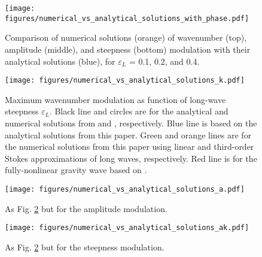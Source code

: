 \documentclass[lineno]{jfm}
\begin{document}
\begin{figure}
\centering
\texttt{[image: figures/numerical\_vs\_analytical\_solutions\_with\_phase.pdf]}
\caption{
  Comparison of numerical solutions (orange) of wavenumber (top), amplitude
  (middle), and steepness (bottom) modulation with their analytical solutions
  (blue), for $\varepsilon_L$ = 0.1, 0.2, and 0.4.
}
\label{fig:numerical_solutions}
\end{figure}

\begin{figure}
\centering
\texttt{[image: figures/numerical\_vs\_analytical\_solutions\_k.pdf]}
\caption{
  Maximum wavenumber modulation as function of long-wave steepness $\varepsilon_L$.
  Black line and circles are for the analytical and numerical solutions from
  \citet{longuet1960changes} and \citet{longuet1987propagation}, respectively.
  Blue line is based on the analytical solutions from this paper.
  Green and orange lines are for the numerical solutions from this paper
  using linear and third-order Stokes approximations of long waves, respectively.
  Red line is for the fully-nonlinear gravity wave based on \citet{clamond2018accurate}.
}
\label{fig:numerical_vs_analytical_k}
\end{figure}

\begin{figure}
\centering
\texttt{[image: figures/numerical\_vs\_analytical\_solutions\_a.pdf]}
\caption{
  As Fig. \ref{fig:numerical_vs_analytical_k} but for the amplitude modulation.
}
\label{fig:numerical_vs_analytical_a}
\end{figure}

\begin{figure}
\centering
\texttt{[image: figures/numerical\_vs\_analytical\_solutions\_ak.pdf]}
\caption{
  As Fig. \ref{fig:numerical_vs_analytical_k} but for the steepness modulation.
}
\label{fig:numerical_vs_analytical_ak}
\end{figure}
\end{document}
